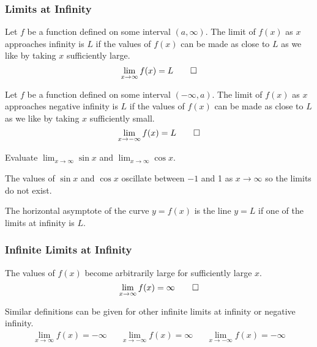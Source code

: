 \subsubsection{Limits at Infinity}
\begin{definition}
    Let \(f\) be a function defined on some interval \((a,\infty)\).
    The limit of \(f(x)\) as \(x\) approaches infinity is \(L\) if the values
    of \(f(x)\) can be made as close to \(L\) as we like by taking \(x\)
    sufficiently large.
    \[\lim_{x\to\infty}f(x)=L\qedhere\]
\end{definition}
\begin{definition}
    Let \(f\) be a function defined on some interval \((-\infty,a)\).
    The limit of \(f(x)\) as \(x\) approaches negative infinity is \(L\) if
    the values of \(f(x)\) can be made as close to \(L\) as we like by taking
    \(x\) sufficiently small.
    \[\lim_{x\to -\infty}f(x)=L\qedhere\]
\end{definition}
\begin{problem}
    Evaluate \(\lim_{x\to\infty}\sin x\) and \(\lim_{x\to\infty}\cos x\).
\end{problem}
\begin{solution}
    The values of \(\sin x\) and \(\cos x\) oscillate between \(-1\) and 1 as
    \(x\to\infty\) so the limits do not exist.
\end{solution}
\begin{definition}
    The horizontal asymptote of the curve \(y=f(x)\) is the line \(y=L\) if
    one of the limits at infinity is \(L\).
\end{definition}

\subsubsection{Infinite Limits at Infinity}
\begin{definition}
    The values of \(f(x)\) become arbitrarily large for sufficiently large
    \(x\).
    \[\lim_{x\to\infty}f(x)=\infty\qedhere\]
\end{definition}
Similar definitions can be given for other infinite limits at infinity or
negative infinity.
\begin{align*}
    &\lim_{x\to\infty}f(x)=-\infty && \lim_{x\to -\infty}f(x)=\infty &
    & \lim_{x\to -\infty}f(x)=-\infty&
\end{align*}

